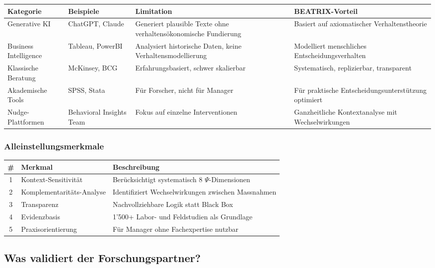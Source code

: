 \documentclass[11pt,a4paper]{article}
\begin{document}
\begin{table}[h]
\centering
\small
\begin{tabularx}{\textwidth}{lXXX}
\toprule
\textbf{Kategorie} & \textbf{Beispiele} & \textbf{Limitation} & \textbf{BEATRIX-Vorteil} \\
\midrule
Generative KI & ChatGPT, Claude & Generiert plausible Texte ohne verhaltensökonomische Fundierung & Basiert auf axiomatischer Verhaltenstheorie \\
Business Intelligence & Tableau, PowerBI & Analysiert historische Daten, keine Verhaltensmodellierung & Modelliert menschliches Entscheidungsverhalten \\
Klassische Beratung & McKinsey, BCG & Erfahrungsbasiert, schwer skalierbar & Systematisch, replizierbar, transparent \\
Akademische Tools & SPSS, Stata & Für Forscher, nicht für Manager & Für praktische Entscheidungsunterstützung optimiert \\
Nudge-Plattformen & Behavioral Insights Team & Fokus auf einzelne Interventionen & Ganzheitliche Kontextanalyse mit Wechselwirkungen \\
\bottomrule
\end{tabularx}
\end{table}

\subsubsection{Alleinstellungsmerkmale}

\begin{table}[h]
\centering
\begin{tabularx}{\textwidth}{clX}
\toprule
\textbf{\#} & \textbf{Merkmal} & \textbf{Beschreibung} \\
\midrule
1 & Kontext-Sensitivität & Berücksichtigt systematisch 8 $\Psi$-Dimensionen \\
2 & Komplementaritäts-Analyse & Identifiziert Wechselwirkungen zwischen Massnahmen \\
3 & Transparenz & Nachvollziehbare Logik statt Black Box \\
4 & Evidenzbasis & 1'500+ Labor- und Feldstudien als Grundlage \\
5 & Praxisorientierung & Für Manager ohne Fachexpertise nutzbar \\
\bottomrule
\end{tabularx}
\end{table}

\subsection{Was validiert der Forschungspartner?}
\end{document}
